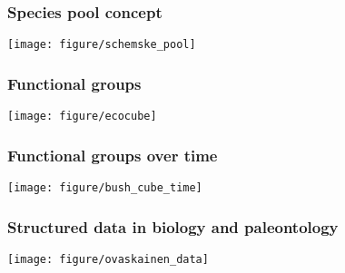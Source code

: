\documentclass{beamer}
\begin{document}
\begin{frame}
  \frametitle{Species pool concept}

  \begin{center}
    \texttt{[image: figure/schemske\_pool]}
  \end{center}

  \tiny{}
\end{frame}

\begin{frame}
  \frametitle{Functional groups}

  \begin{center}
    \texttt{[image: figure/ecocube]}
  \end{center}

  \tiny{}
\end{frame}

\begin{frame}
  \frametitle{Functional groups over time}

  \begin{center}
    \texttt{[image: figure/bush\_cube\_time]}
  \end{center}

  \tiny{}
\end{frame}



\begin{frame}
  \frametitle{Structured data in biology and paleontology}

  \begin{center}
    \texttt{[image: figure/ovaskainen\_data]}
  \end{center}

  \tiny{}
\end{frame}
\end{document}
